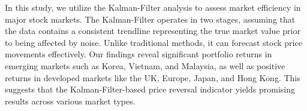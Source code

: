 In this study, we utilize the Kalman-Filter analysis to assess market efficiency in major stock markets. The Kalman-Filter operates in two stages, assuming that the data contains a consistent trendline representing the true market value prior to being affected by noise. Unlike traditional methods, it can forecast stock price movements effectively. Our findings reveal significant portfolio returns in emerging markets such as Korea, Vietnam, and Malaysia, as well as positive returns in developed markets like the UK, Europe, Japan, and Hong Kong. This suggests that the Kalman-Filter-based price reversal indicator yields promising results across various market types.